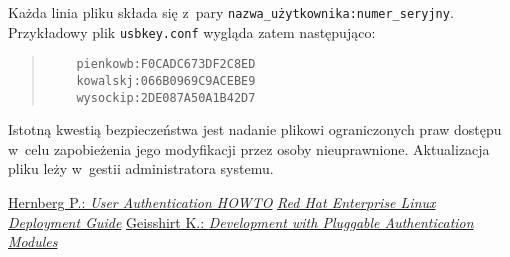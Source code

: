 \documentclass[a4paper,11pt]{article}
\begin{document}
Każda linia pliku składa się z~pary \verb|nazwa_użytkownika:numer_seryjny|. Przykładowy plik \verb|usbkey.conf| wygląda zatem następująco:
\begin{quote}
	\begin{verbatim}
	pienkowb:F0CADC673DF2C8ED
	kowalskj:066B0969C9ACEBE9
	wysockip:2DE087A50A1B42D7
	\end{verbatim}
\end{quote}

Istotną kwestią bezpieczeństwa jest nadanie plikowi ograniczonych praw dostępu w~celu zapobieżenia jego modyfikacji przez osoby nieuprawnione. Aktualizacja pliku leży w~gestii administratora systemu.


\begin{thebibliography}{}
	 \href{http://www.faqs.org/docs/Linux-HOWTO/User-Authentication-HOWTO.html\#AEN101}
		{Hernberg P.: \emph{User Authentication HOWTO}}
	 \href{http://www.centos.org/docs/5/html/Deployment\_Guide-en-US/ch-pam.html}
		{\emph{Red Hat Enterprise Linux Deployment Guide}}
	 \href{http://www.packtpub.com/article/development-with-pluggable-authentication-modules-pam}
		{Geisshirt K.: \emph{Development with Pluggable Authentication Modules}}
\end{thebibliography}
\end{document}

